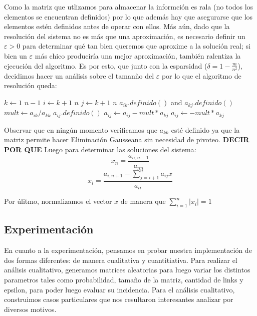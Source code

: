 \par Como la matriz que utlizamos para almacenar la informci\'on es rala (no todos los elementos se encuentran definidos) por lo que 
adem\'as hay que asegurarse que los elementos est\'en definidos antes de operar con ellos. M\'as a\'un, dado que la resoluci\'on
del sistema no es m\'as que una aproximaci\'on, es necesario definir un $\varepsilon > 0$ para determinar qu\'e tan bien queremos que 
aproxime a la soluci\'on real; si bien un $\varepsilon$ m\'as chico producir\'ia una mejor aproximaci\'on, tambi\'en ralentiza la
ejecuci\'on del algoritmo. Es por esto, que junto con la esparsidad ($\delta = 1 - \frac{m}{n^2}$), decidimos hacer un an\'alisis
sobre el taman\~no del $\varepsilon$ por lo que el algoritmo de resoluci\'on queda:

\begin{codebox}
\li \For $k \gets 1$ \To $n-1$
    \Do
\li     \For $i \gets k+1$ \To $n$
            \Do
\li         \For $j \gets k+1$ \To $n$
                \Do
\li                \If $a_{ik}.definido()$ and $a_{kj}.definido()$
                        \Then
\li                        $mult \gets a_{ik}/a_{kk}$
\li                     \If $a_{ij}.definido()$
                            \Then
\li                          $a_{ij} \gets a_{ij} - mult*a_{kj}$
\li                     \Else
\li                          $a_{ij} \gets - mult*a_{kj}$
                \End
            \End
        \End
\end{codebox}
Observar que en ning\'un momento verificamos que $a_{kk}$ est\'e definido ya que la matriz permite hacer Eliminación Gausseana sin necesidad
de pivoteo. \textbf{DECIR POR QUE}
Luego para determinar las soluciones del sistema\cite{burden}:
\[
    x_n = \frac{a_{n,n-1}}{a_{nn}}
    \]
    \[
    x_i = \frac {a_{i,n+1} - \sum_{j=i+1}^{n} a_{ij}x} {a_{ii}}
    \]

Por \'ulitmo, normalizamos el vector $x$ de manera que $\sum^{n}_{i=1} |x_i| = 1$
\subsection*{Experimentaci\'on}
\par
En cuanto a la experimentaci\'on, pensamos en probar nuestra implementaci\'on de dos formas diferentes: de manera cualitativa y cuantitiativa.
Para realizar el an\'alisis cualitativo, generamos matrices aleatorias para luego variar los distintos parametros tales como probabilidad, 
tamaño de la matriz, cantidad de links y epsilon, para poder luego evaluar su incidencia. Para el an\'alisis cualitativo, construimos casos particulares
que nos resultaron interesantes analizar por diversos motivos.

